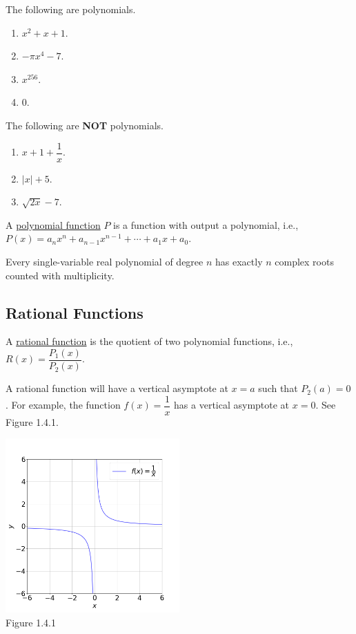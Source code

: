 \documentclass[11pt]{book}
\theoremstyle{break}
\theoremstyle{no_label}
\newcommand{\figtag}[1]{\\[-1.2em]Figure {#1}}
\numberwithin{equation}{section}
\begin{document}
\begin{example}
    The following are polynomials.
    \begin{enumerate}
        \item $x^2+x+1$.
        \item $-\pi x^4-7$.
        \item $x^{256}$.
        \item $0$.
    \end{enumerate}
\end{example}

\begin{example}
    The following are \textbf{NOT} polynomials.
    \begin{enumerate}
        \item $x+1+\dfrac{1}{x}$.
        \item $|x|+5$.
        \item $\sqrt{2x}-7$.
    \end{enumerate}
\end{example}

\begin{definition}
    A \underline{polynomial function} $P$ is a function with output a polynomial, i.e., $P(x)=a_nx^n+a_{n-1}x^{n-1}+\cdots+a_1x+a_0$.
\end{definition}

\begin{theorem}
    Every single-variable real polynomial of degree $n$ has exactly $n$ complex roots counted with multiplicity.
\end{theorem}

\subsection*{Rational Functions}

\begin{definition}
    A \underline{rational function} is the quotient of two polynomial functions, i.e., $R(x)=\dfrac{P_1(x)}{P_2(x)}$.
\end{definition}

A rational function will have a vertical asymptote at $x=a$ such that $P_2(a)=0$. For example, the function $f(x)=\dfrac{1}{x}$ has a vertical asymptote at $x=0$. See Figure 1.4.1.

\begin{center}
    \includegraphics[width=0.5\textwidth]{reciprocal_of_x.png}\figtag{1.4.1}
\end{center}
\end{document}
